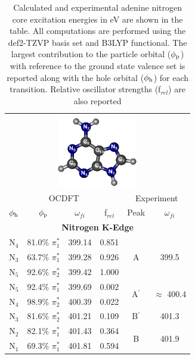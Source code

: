 \documentclass[8.5pt,twoside,twocolumn]{article}
\begin{document}
 \begin{table}[!ht]
 \footnotesize
\caption{Calculated and experimental adenine nitrogen core excitation energies in eV are shown in the table. All computations are performed using the def2-TZVP basis set and B3LYP functional. The largest contribution to the particle orbital ($\phi_{\rm p}$) with reference to the ground state valence set is reported along with the hole orbital ($\phi_{\rm h}$) for each transition. Relative oscillator strengths (f$_{rel}$) are also reported}
 \centering
     \begin{tabular*}{8.5cm}{@{\extracolsep{\fill} }cccccc}
     \hline\hline\\[-8pt]
     \multicolumn{6}{c}{
 \includegraphics[width=3.5cm]{AdenineNumbering.png}}\\
     \hline
   \multicolumn{4}{c}{OCDFT} &\multicolumn{2}{c}{Experiment} \\
 $\phi_{\rm h}$ &  $\phi_{\rm p}$ & $\omega_{fi}$ & f$_{rel}$ & Peak &  $\omega_{fi}$   \\[1pt]
   \hline
    \multicolumn{6}{c}{\textbf{Nitrogen K-Edge}} \vspace{0.05in}\\
    N$_4$
 &   81.0$\%$ $\pi_1^*$  & 399.14 & 0.851 & \multirow{3}{*}{A} & \multirow{3}{*}{399.5} \\
    N$_3$
 &   63.7$\%$ $\pi_1^*$  & 399.28 & 0.926 \\
    N$_5$
 &   92.6$\%$ $\pi_2^*$  & 399.42 & 1.000 
\vspace{0.05in}\\
    N$_5$
 &   92.4$\%$ $\pi_1^*$  & 399.69 & 0.002 & \multirow{2}{*}{A$^{\prime}$} & \multirow{2}{*}{$\approx$ 400.4}  \\
    N$_4$
 &   98.9$\%$ $\pi_2^*$
 & 400.39 & 0.022 
 \vspace{0.05in}\\
    N$_3$
 &   81.6$\%$ $\pi_2^*$  & 401.21 & 0.109 & B$^{\prime}$ & 401.3 
 \vspace{0.05in}\\
    N$_2$
 &   82.1$\%$ $\pi_1^*$  & 401.43 & 0.364 & \multirow{3}{*}{B} & \multirow{3}{*}{401.9}\\
    N$_1$
 &   69.3$\%$ $\pi_1^*$  & 401.81 & 0.594 \\

\end{tabular*}
\end{table}
\end{document}
